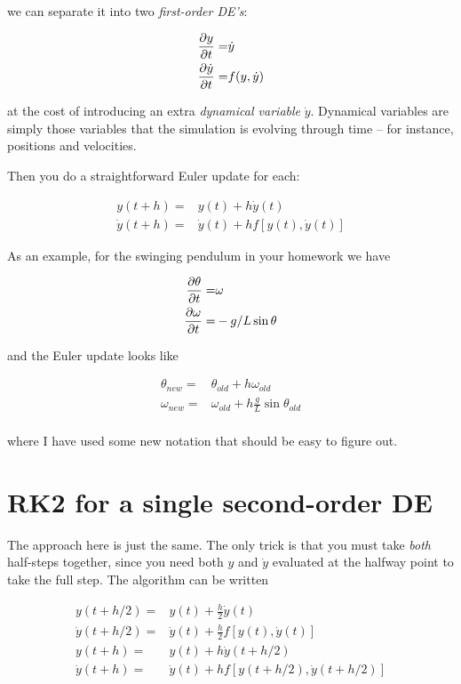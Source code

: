 \documentclass[12ampt]{article}
\def\PAR#1#2{ {{\partial #1}\over{\partial #2}} }
\begin{document}
we can separate it into two {\it first-order DE's}:

\begin{align}
  \PAR {y}{t} =& \dot y \\
  \PAR {\dot y}{t} =& f(y,\dot y)
\end{align}

at the cost of introducing an extra {\it dynamical variable} $\dot y$. Dynamical variables are simply those variables that the simulation is evolving through time -- for instance, positions and velocities.

Then you do a straightforward Euler update for each:

\begin{align}
  y(t+h) =& y(t) + h \dot y(t) \\
  \dot y(t+h) =& \dot y(t) + h f\left[y(t),\dot y(t)\right]
\end{align}

As an example, for the swinging pendulum in your homework we have

\begin{align}
  \PAR{\theta}{t} =& \omega \\
  \PAR{\omega}{t} =& -g/L \sin \theta
\end{align}

and the Euler update looks like

\begin{align}
  \theta_{new} =& \theta_{old} + h \omega_{old} \\
  \omega_{new} =& \omega_{old} + h \frac{g}{L} \sin \theta_{old} \\
\end{align}

where I have used some new notation that should be easy to figure out.


\section{RK2 for a single second-order DE}

The approach here is just the same. The only trick is that you must take {\it both} half-steps together, since you need both $y$ and $\dot y$ evaluated at the halfway point to take the full step. The algorithm can be written

  \begin{align*}
    y\left(t+h/2\right) =& y(t) + \frac{h}{2} \dot y(t) \\
    \dot y\left(t+h/2\right) =& \dot y(t) + \frac{h}{2} f\left[y(t),\dot y(t)\right] \\
    y(t+h) =& y(t) + h \dot y(t+h/2) \\
   \dot y(t+h) =& \dot y(t) + h f\left[y\left(t+h/2\right),\dot y\left(t+h/2\right)\right]
  \end{align*}
\end{document}
